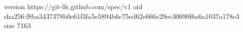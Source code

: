 version https://git-lfs.github.com/spec/v1
oid sha256:f8ba3437378b0e61f3fa5e5894b6c75ed62e666e29ec30690f6a6a1037a178e3
size 7163
